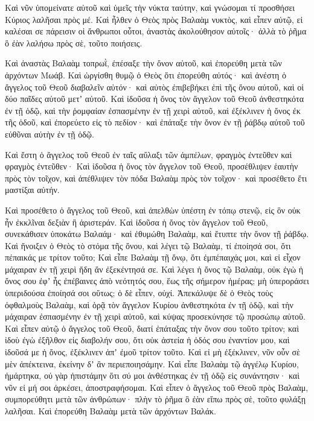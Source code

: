 {Καὶ νῦν ὑπομείνατε αὐτοῦ καὶ ὑμεῖς τὴν νύκτα ταύτην, καὶ γνώσομαι τί προσθήσει Κύριος λαλῆσαι πρὸς μέ.
Καὶ ἦλθεν ὁ Θεὸς πρὸς Βαλαὰμ νυκτὸς, καὶ εἶπεν αὐτῷ, εἰ καλέσαι σε πάρεισιν οἱ ἄνθρωποι οὗτοι, ἀναστὰς ἀκολούθησον αὐτοῖς· ἀλλὰ τὸ ῥῆμα ὃ ἐὰν λαλήσω πρὸς σὲ, τοῦτο ποιήσεις.
\par }{\PP {}Καὶ ἀναστὰς Βαλαὰμ τοπρωῒ, ἐπέσαξε τὴν ὄνον αὐτοῦ, καὶ ἐπορεύθη μετὰ τῶν ἀρχόντων Μωάβ.
Καὶ ὠργίσθη θυμῷ ὁ Θεὸς ὅτι ἐπορεύθη αὐτός· καὶ ἀνέστη ὁ ἄγγελος τοῦ Θεοῦ διαβαλεῖν αὐτόν· καὶ αὐτὸς ἐπιβεβήκει ἐπὶ τῆς ὄνου αὐτοῦ, καὶ οἱ δύο παῖδες αὐτοῦ μετʼ αὐτοῦ.
Καὶ ἰδοῦσα ἡ ὄνος τὸν ἄγγελον τοῦ Θεοῦ ἀνθεστηκότα ἐν τῇ ὁδῷ, καὶ τὴν ῥομφαίαν ἐσπασμένην ἐν τῇ χειρὶ αὐτοῦ, καὶ ἐξέκλινεν ἡ ὄνος ἐκ τῆς ὁδοῦ, καὶ ἐπορεύετο εἰς τὸ πεδίον· καὶ ἐπάταξε τὴν ὄνον ἐν τῇ ῥάβδῳ αὐτοῦ τοῦ εὐθῦναι αὐτὴν ἐν τῇ ὁδῷ.
\par }{\PP {}Καὶ ἔστη ὁ ἄγγελος τοῦ Θεοῦ ἐν ταῖς αὔλαξι τῶν ἀμπέλων, φραγμὸς ἐντεῦθεν καὶ φραγμὸς ἐντεῦθεν·
Καὶ ἰδοῦσα ἡ ὄνος τὸν ἄγγελον τοῦ Θεοῦ, προσέθλιψεν ἑαυτὴν πρὸς τὸν τοῖχον, καὶ ἀπέθλιψεν τὸν πόδα Βαλαὰμ πρὸς τὸν τοῖχον· καὶ προσέθετο ἔτι μαστίξαι αὐτήν.
\par }{\PP {}Καὶ προσέθετο ὁ ἄγγελος τοῦ Θεοῦ, καὶ ἀπελθὼν ὑπέστη ἐν τόπῳ στενῷ, εἰς ὃν οὐκ ἦν ἐκκλῖναι δεξιὰν ἢ ἀριστεράν.
Καὶ ἰδοῦσα ἡ ὄνος τὸν ἄγγελον τοῦ Θεοῦ, συνεκάθισεν ὑποκάτω Βαλαάμ· καὶ ἐθυμώθη Βαλαὰμ, καὶ ἔτυπτε τὴν ὄνον τῇ ῥάβδῳ.
Καὶ ἤνοιξεν ὁ Θεὸς τὸ στόμα τῆς ὄνου, καὶ λέγει τῷ Βαλαὰμ, τί ἐποίησά σοι, ὅτι πέπαικάς με τρίτον τοῦτο;
Καὶ εἶπε Βαλαὰμ τῇ ὄνῳ, ὅτι ἐμπέπαιχάς μοι, καὶ εἰ εἶχον μάχαιραν ἐν τῇ χειρὶ ἤδη ἂν ἐξεκέντησά σε.
Καὶ λέγει ἡ ὄνος τῷ Βαλαὰμ, οὐκ ἐγὼ ἡ ὄνος σου ἐφʼ ἧς ἐπέβαινες ἀπὸ νεότητός σου, ἕως τῆς σήμερον ἡμέρας; μὴ ὑπεροράσει ὑπεριδούσα ἐποίησά σοι οὕτως; ὁ δὲ εἶπεν, οὐχί.
Ἀπεκάλυψε δὲ ὁ Θεὸς τοὺς ὀφθαλμοὺς Βαλαὰμ, καὶ ὁρᾷ τὸν ἄγγελον Κυρίου ἀνθεστηκότα ἐν τῇ ὁδῷ, καὶ τὴν μάχαιραν ἐσπασμένην ἐν τῇ χειρὶ αὐτοῦ, καὶ κύψας προσεκύνησε τῷ προσώπῳ αὐτοῦ.
Καὶ εἶπεν αὐτῷ ὁ ἄγγελος τοῦ Θεοῦ, διατί ἐπάταξας τὴν ὄνον σου τοῦτο τρίτον; καὶ ἰδοὺ ἐγὼ ἐξῆλθον εἰς διαβολήν σου, ὅτι οὐκ ἀστεία ἡ ὁδός σου ἐναντίον μου, καὶ ἰδοῦσά με ἡ ὄνος, ἐξέκλινεν ἀπʼ ἐμοῦ τρίτον τοῦτο.
Καὶ εἰ μὴ ἐξέκλινεν, νῦν οὖν σὲ μὲν ἀπέκτεινα, ἐκείνην δʼ ἂν περιεποιησάμην.
Καὶ εἶπε Βαλαὰμ τῷ ἀγγέλῳ Κυρίου, ἡμάρτηκα, οὐ γὰρ ἠπιστάμην ὅτι σύ μοι ἀνθέστηκας ἐν τῇ ὁδῷ εἰς συνάντησιν· καὶ νῦν εἰ μή σοι ἀρκέσει, ἀποστραφήσομαι.
Καὶ εἶπεν ὁ ἄγγελος τοῦ Θεοῦ πρὸς Βαλαὰμ, συμπορεύθητι μετὰ τῶν ἀνθρώπων· πλὴν τὸ ῥῆμα ὃ ἐὰν εἴπω πρὸς σὲ, τοῦτο φυλάξῃ λαλῆσαι. Καὶ ἐπορεύθη Βαλαὰμ μετὰ τῶν ἀρχόντων Βαλάκ.
}
